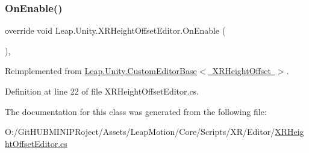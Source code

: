 \subsubsection{\texorpdfstring{OnEnable()}{OnEnable()}}
{\footnotesize\ttfamily override void Leap.\+Unity.\+X\+R\+Height\+Offset\+Editor.\+On\+Enable (\begin{DoxyParamCaption}{ }\end{DoxyParamCaption})\hspace{0.3cm}{\ttfamily [protected]}, {\ttfamily [virtual]}}



Reimplemented from \mbox{\hyperlink{class_leap_1_1_unity_1_1_custom_editor_base_a2268bc01655342bd3da5ae015bfa2f93}{Leap.\+Unity.\+Custom\+Editor\+Base$<$ X\+R\+Height\+Offset $>$}}.



Definition at line 22 of file X\+R\+Height\+Offset\+Editor.\+cs.



The documentation for this class was generated from the following file\+:\begin{DoxyCompactItemize}
\item 
O\+:/\+Git\+H\+U\+B\+M\+I\+N\+I\+P\+Roject/\+Assets/\+Leap\+Motion/\+Core/\+Scripts/\+X\+R/\+Editor/\mbox{\hyperlink{_x_r_height_offset_editor_8cs}{X\+R\+Height\+Offset\+Editor.\+cs}}\end{DoxyCompactItemize}
